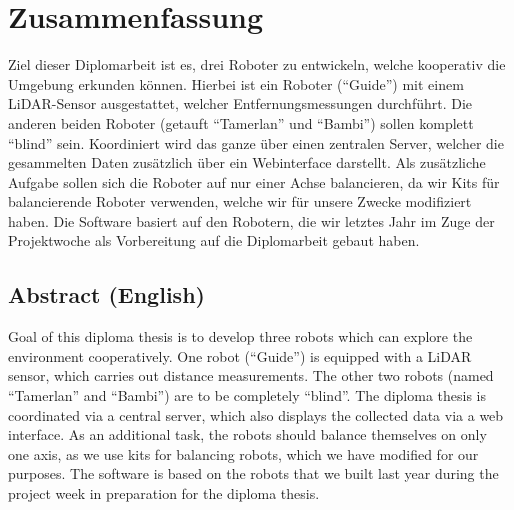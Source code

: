 
\chapter{Zusammenfassung}
Ziel dieser Diplomarbeit ist es, drei Roboter zu entwickeln,
welche kooperativ die Umgebung erkunden können.
%
Hierbei ist ein Roboter (``Guide'') mit einem LiDAR-Sensor ausgestattet,
welcher Entfernungsmessungen durchführt.
%
Die anderen beiden Roboter (getauft ``Tamerlan'' und ``Bambi'')
sollen komplett ``blind'' sein.
%
Koordiniert wird das ganze über einen zentralen Server,
welcher die gesammelten Daten zusätzlich über ein Webinterface darstellt.
%
Als zusätzliche Aufgabe sollen sich die Roboter auf nur einer Achse balancieren,
da wir Kits für balancierende Roboter verwenden,
welche wir für unsere Zwecke modifiziert haben.
Die Software basiert auf den Robotern,
die wir letztes Jahr im Zuge der Projektwoche als Vorbereitung auf die Diplomarbeit gebaut haben.
\section{Abstract (English)}
Goal of this diploma thesis is to develop three robots which
can explore the environment cooperatively.
%
One robot (``Guide'') is equipped with a LiDAR sensor,
which carries out distance measurements.
%
The other two robots (named ``Tamerlan'' and ``Bambi'')
are to be completely ``blind''.
%
The diploma thesis is coordinated via a central server,
which also displays the collected data via a web interface.
%
As an additional task, the robots should balance themselves on only one axis,
as we use kits for balancing robots,
which we have modified for our purposes.
The software is based on the robots
that we built last year during the project week in preparation for the diploma thesis.